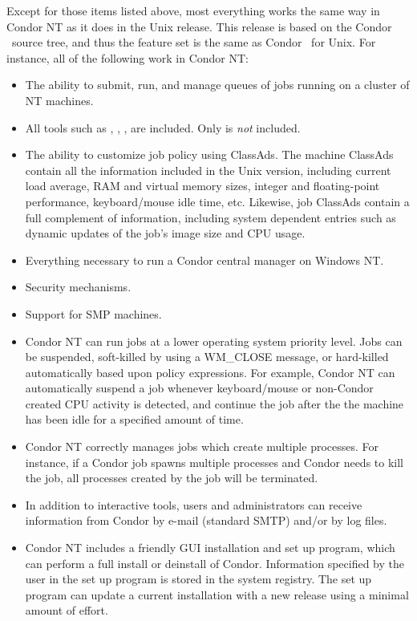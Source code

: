 Except for those items listed above, most everything works
the same way in Condor NT as it does in the Unix release.
This release is based on the Condor \VersionNotice\ source tree, and thus the
feature set is the same as Condor \VersionNotice\ for Unix.  
For instance, all of the following work in Condor NT:
\begin{itemize}

\item The ability to submit, run, and manage queues of jobs running on a
cluster of NT machines.

\item All tools such as , , ,
are included. Only  is
\emph{not} included.

\item The ability to customize job policy using ClassAds.
The machine ClassAds contain all the information included in the Unix version,
including current load average, RAM and virtual memory sizes, integer and
floating-point performance, keyboard/mouse idle time, etc.  Likewise, job
ClassAds contain a full complement of information, including system
dependent entries such as dynamic updates of the job's image size and CPU
usage.

\item Everything necessary to run a Condor central manager on Windows NT.

\item Security mechanisms.

\item Support for SMP machines.

\item Condor NT can run jobs at a lower operating system priority level.
Jobs can be suspended, soft-killed by using a WM\_CLOSE message,
or hard-killed automatically based upon policy expressions.
For example, Condor NT can automatically suspend a job
whenever keyboard/mouse or non-Condor created CPU activity is detected, and
continue the job after the the machine has been idle for a specified amount
of time.

\item Condor NT correctly manages jobs which create multiple processes.  For
instance, if a Condor job spawns multiple processes and Condor
needs to kill the job,
all processes created by the job will be terminated.

\item In addition to interactive tools, users and administrators can receive
information from Condor by e-mail (standard SMTP) and/or by log files.

\item Condor NT includes a friendly GUI installation and set up program,
which can perform a full install or deinstall of Condor.
Information specified by the user in the set up program is stored in the
system registry.  
The set up program can update a current installation with a
new release using a minimal amount of effort.

\end{itemize}


